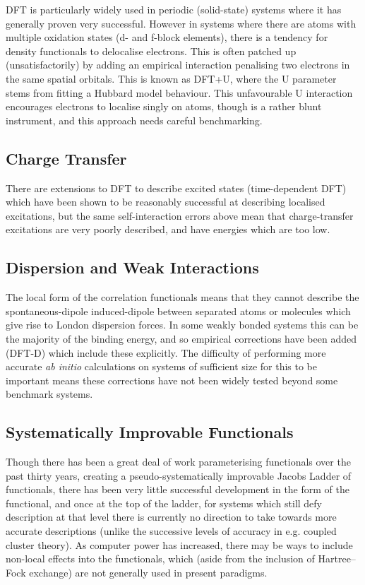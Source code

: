 \documentclass{article}
\theoremstyle{plain}\theoremheaderfont{\normalfont\itshape}\theorembodyfont{\rmfamily}\theoremseparator{.}\newtheorem*{rem}{Remark}\newtheorem*{ex}{Example}\newtheorem*{proof}{Proof}\newtheorem*{altp}{Alternative proof}
\theoremstyle{plain}\theoremheaderfont{\normalfont\bfseries}\theorembodyfont{\rmfamily}\theoremseparator{.}\newtheorem{thm}{Theorem}[section]\newtheorem{lem}[thm]{Lemma}\newtheorem{prop}[thm]{Proposition}\newtheorem*{cor}{Corollary}\newtheorem{defn}[thm]{Definition}\newtheorem{clm}[thm]{Claim}\newtheorem{clminproof}{Claim}
\theoremstyle{break}\theoremheaderfont{\normalfont\itshape}\theorembodyfont{\rmfamily}\theoremseparator{.\medskip}\newtheorem*{proofskip}{Proof}\newtheorem*{exs}{Examples}\newtheorem*{rems}{Remarks}
\theoremstyle{break}\theoremheaderfont{\normalfont\bfseries}\theorembodyfont{\rmfamily}\theoremseparator{.\medskip}\newtheorem{lemskip}[thm]{Lemma}\newtheorem{defnskip}[thm]{Definition}\newtheorem{propskip}[thm]{Proposition}\newtheorem{thmskip}[thm]{Theorem}
\numberwithin{equation}{section}
\begin{document}
    DFT is particularly widely used in periodic (solid-state) systems where it has generally proven very successful. However in systems where there are atoms with multiple oxidation states (d- and f-block elements), there is a tendency for density functionals to delocalise electrons. This is often patched up (unsatisfactorily) by adding an empirical interaction penalising two electrons in the same spatial orbitals. This is known as DFT+U, where the U parameter stems from fitting a Hubbard model behaviour. This unfavourable U interaction encourages electrons to localise singly on atoms, though is a rather blunt instrument, and this approach needs careful benchmarking.

    \subsection{Charge Transfer}
    There are extensions to DFT to describe excited states (time-dependent DFT) which have been shown to be reasonably successful at describing localised excitations, but the same self-interaction errors above mean that charge-transfer excitations are very poorly described, and have energies which are too low.

    \subsection{Dispersion and Weak Interactions}
    The local form of the correlation functionals means that they cannot describe the spontaneous-dipole induced-dipole between separated atoms or molecules which give rise to London dispersion forces. In some weakly bonded systems this can be the majority of the binding energy, and so empirical corrections have been added (DFT-D) which include these explicitly. The difficulty of performing more accurate \textit{ab initio} calculations on systems of sufficient size for this to be important means these corrections have not been widely tested beyond some benchmark systems.

    \subsection{Systematically Improvable Functionals}
    Though there has been a great deal of work parameterising functionals over the past thirty years, creating a pseudo-systematically improvable Jacobs Ladder of functionals, there has been very little successful development in the form of the functional, and once at the top of the ladder, for systems which still defy description at that level there is currently no direction to take towards more accurate descriptions (unlike the successive levels of accuracy in e.g. coupled cluster theory). As computer power has increased, there may be ways to include non-local effects into the functionals, which (aside from the inclusion of Hartree--Fock exchange) are not generally used in present paradigms.
\end{document}
